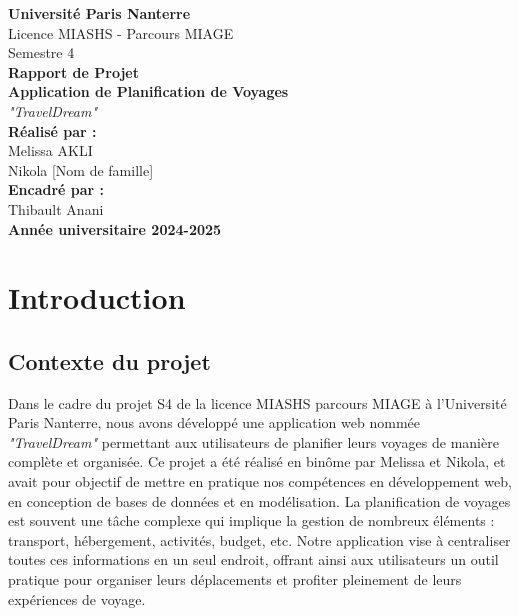 \documentclass[a4paper,12pt]{article}
\begin{document}
\begin{titlepage}
    \centering
    {\Large \textbf{Université Paris Nanterre}}\\[0.5cm]
    {\large Licence MIASHS - Parcours MIAGE}\\[0.2cm]
    {\large Semestre 4}\\[2cm]

    {\huge \textbf{Rapport de Projet}}\\[0.5cm]
    {\LARGE \textbf{Application de Planification de Voyages}}\\[0.5cm]
    {\LARGE \textit{"TravelDream"}}\\[2cm]

    \textbf{Réalisé par :}\\
    Melissa AKLI \\
    Nikola [Nom de famille] \\[0.5cm]

    \textbf{Encadré par :}\\
    Thibault Anani \\[2cm]

    \vfill
    \textbf{Année universitaire 2024-2025}
\end{titlepage}

\newpage
\tableofcontents
\newpage

\section{Introduction}

\subsection{Contexte du projet}
Dans le cadre du projet S4 de la licence MIASHS parcours MIAGE à l'Université Paris Nanterre, nous avons développé une application web nommée \textit{"TravelDream"} permettant aux utilisateurs de planifier leurs voyages de manière complète et organisée. Ce projet a été réalisé en binôme par Melissa et Nikola, et avait pour objectif de mettre en pratique nos compétences en développement web, en conception de bases de données et en modélisation. 
La planification de voyages est souvent une tâche complexe qui implique la gestion de nombreux éléments : transport, hébergement, activités, budget, etc. Notre application vise à centraliser toutes ces informations en un seul endroit, offrant ainsi aux utilisateurs un outil pratique pour organiser leurs déplacements et profiter pleinement de leurs expériences de voyage.
\end{document}
